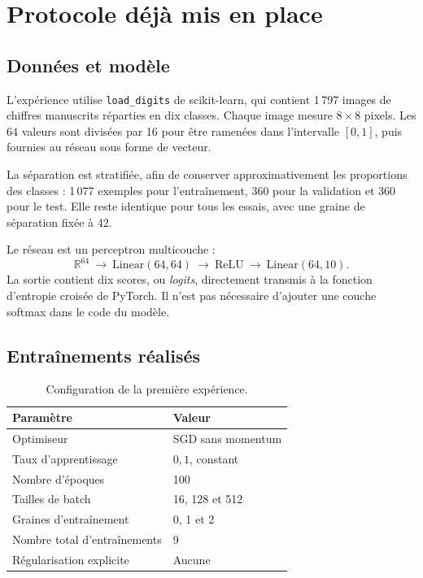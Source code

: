 \documentclass[11pt,a4paper]{article}
\begin{document}
\section{Protocole déjà mis en place}

\subsection{Données et modèle}

L'expérience utilise \texttt{load\_digits} de scikit-learn, qui contient 1\,797 images de chiffres manuscrits réparties en dix classes. Chaque image mesure $8\times8$ pixels. Les 64 valeurs sont divisées par 16 pour être ramenées dans l'intervalle $[0,1]$, puis fournies au réseau sous forme de vecteur.

La séparation est stratifiée, afin de conserver approximativement les proportions des classes : 1\,077 exemples pour l'entraînement, 360 pour la validation et 360 pour le test. Elle reste identique pour tous les essais, avec une graine de séparation fixée à 42.

Le réseau est un perceptron multicouche :
\[
\mathbb{R}^{64}\ \longrightarrow\ \mathrm{Linear}(64,64)
\ \longrightarrow\ \mathrm{ReLU}
\ \longrightarrow\ \mathrm{Linear}(64,10).
\]
La sortie contient dix scores, ou \emph{logits}, directement transmis à la fonction d'entropie croisée de PyTorch. Il n'est pas nécessaire d'ajouter une couche softmax dans le code du modèle.

\subsection{Entraînements réalisés}

\begin{table}[htbp]
\centering
\begin{tabular}{ll}
\toprule
Paramètre & Valeur \\
\midrule
Optimiseur & SGD sans momentum \\
Taux d'apprentissage & $0{,}1$, constant \\
Nombre d'époques & 100 \\
Tailles de batch & 16, 128 et 512 \\
Graines d'entraînement & 0, 1 et 2 \\
Nombre total d'entraînements & 9 \\
Régularisation explicite & Aucune \\
\bottomrule
\end{tabular}
\caption{Configuration de la première expérience.}
\end{table}
\end{document}
